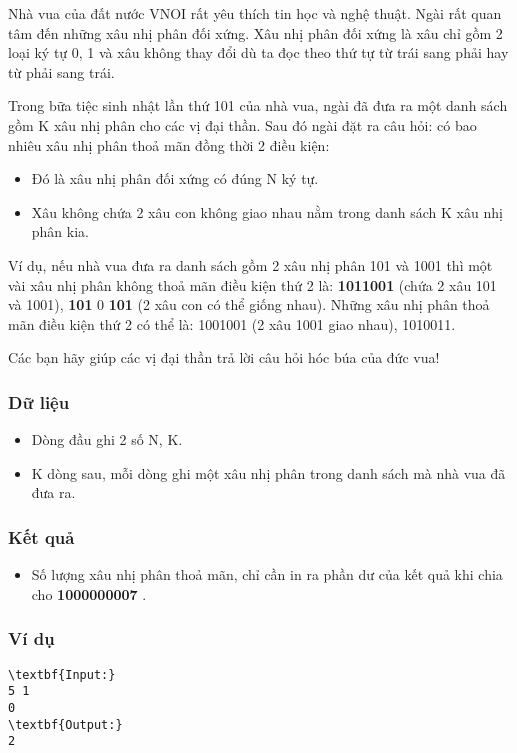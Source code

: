 

Nhà vua của đất nước VNOI rất yêu thích tin học và nghệ thuật. Ngài rất quan tâm đến những xâu nhị phân đối xứng. Xâu nhị phân đối xứng là xâu chỉ gồm 2 loại ký tự 0, 1 và xâu không thay đổi dù ta đọc theo thứ tự từ trái sang phải hay từ phải sang trái.

Trong bữa tiệc sinh nhật lần thứ 101 của nhà vua, ngài đã đưa ra một danh sách gồm K xâu nhị phân cho các vị đại thần. Sau đó ngài đặt ra câu hỏi: có bao nhiêu xâu nhị phân thoả mãn đồng thời 2 điều kiện:
\begin{itemize}
	\item Đó là xâu nhị phân đối xứng có đúng N ký tự.
	\item Xâu không chứa 2 xâu con không giao nhau nằm trong danh sách K xâu nhị phân kia.
\end{itemize}

Ví dụ, nếu nhà vua đưa ra danh sách gồm 2 xâu nhị phân 101 và 1001 thì một vài xâu nhị phân không thoả mãn điều kiện thứ 2 là: \textbf{ 1011001 } (chứa 2 xâu 101 và 1001), \textbf{ 101 } 0 \textbf{ 101 } (2 xâu con có thể giống nhau). Những xâu nhị phân thoả mãn điều kiện thứ 2 có thể là: 1001001 (2 xâu 1001 giao nhau), 1010011.

Các bạn hãy giúp các vị đại thần trả lời câu hỏi hóc búa của đức vua!

\subsubsection{Dữ liệu}
\begin{itemize}
	\item Dòng đầu ghi 2 số N, K.
	\item K dòng sau, mỗi dòng ghi một xâu nhị phân trong danh sách mà nhà vua đã đưa ra.
\end{itemize}

\subsubsection{Kết quả}
\begin{itemize}
	\item Số lượng xâu nhị phân thoả mãn, chỉ cần in ra phần dư của kết quả khi chia cho \textbf{ 1000000007 } .
\end{itemize}

\subsubsection{Ví dụ}
\begin{verbatim}
\textbf{Input:}
5 1
0
\textbf{Output:}
2\end{verbatim}


